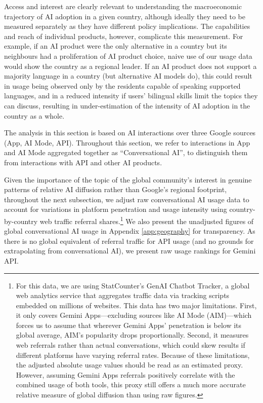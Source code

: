 \documentclass[11pt,a4paper]{article}
\begin{document}
Access and interest are clearly relevant to understanding the macroeconomic trajectory of AI adoption in a given country, although ideally they need to be measured separately as they have different policy implications. The capabilities and reach of individual products, however, complicate this measurement. For example, if an AI product were the only alternative in a country but its neighbours had a proliferation of AI product choice, naive use of our usage data would show the country as a regional leader. If an AI product does not support a majority language in a country (but alternative AI models do), this could result in usage being observed only by the residents capable of speaking supported languages, and in a reduced intensity if users’ bilingual skills limit the topics they can discuss, resulting in under-estimation of the intensity of AI adoption in the country as a whole.

The analysis in this section is based on AI interactions over three Google sources (App, AI Mode, API). Throughout this section, we refer to interactions in App and AI Mode aggregated together as ``Conversational AI'', to distinguish them from interactions with API and other AI products.

Given the importance of the topic of the global community’s interest in genuine patterns of relative AI diffusion rather than Google’s regional footprint, throughout the next subsection, we adjust raw conversational AI usage data to account for variations in platform penetration and usage intensity using country-by-country web traffic referral shares.\footnote{For this data, we are using StatCounter’s \citep{statcounter2026aichatbot} GenAI Chatbot Tracker, a global web analytics service that aggregates traffic data via tracking scripts embedded on millions of websites. This data has two major limitations. First, it only covers Gemini Apps—excluding sources like AI Mode (AIM)—which forces us to assume that wherever Gemini Apps' penetration is below its global average, AIM's popularity drops proportionally. Second, it measures web referrals rather than actual conversations, which could skew results if different platforms have varying referral rates. Because of these limitations, the adjusted absolute usage values should be read as an estimated proxy. However, assuming Gemini Apps referrals positively correlate with the combined usage of both tools, this proxy still offers a much more accurate relative measure of global diffusion than using raw figures.} We also present the unadjusted figures of global conversational AI usage in Appendix \ref{app:geography} for transparency. As there is no global equivalent of referral traffic for API usage (and no grounds for extrapolating from conversational AI), we present raw usage rankings for Gemini API.
\end{document}
